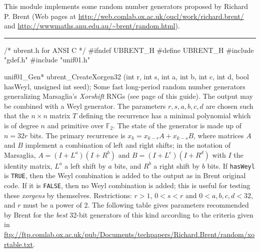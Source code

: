
This module implements some random number generators proposed by Richard
  P. Brent (Web pages at %
\url{http://web.comlab.ox.ac.uk/oucl/work/richard.brent/}
and \url{http://wwwmaths.anu.edu.au/~brent/random.html}).


\bigskip
\hrule
\code\hide
/* ubrent.h for ANSI C */
#ifndef UBRENT_H
#define UBRENT_H
\endhide
#include "gdef.h"
#include "unif01.h"
\endcode

\code

unif01_Gen* ubrent_CreateXorgen32 (int r, int s, int a, int b, int c, int d,
                                   bool hasWeyl, unsigned int seed);
\endcode
  \tab Some fast long-period random number generators \cite{rBRE04a} 
        generalizing Marsaglia's \textit{Xorshift} RNGs \cite{rMAR03a} 
 (see page \pageref{marsa-xorshift} of this guide).  The
   output may be combined with a Weyl generator.
 The parameters $r, s, a, b,  c, d$ are chosen such that the $n \times n$
   matrix $T$ defining the recurrence has a minimal polynomial which
%
      is of degree $n$ and primitive over $\mathbb{F}_2$. 
The state of the generator is made up of $n= 32 r$ bits.
The primary recurrence is $x_k = x_{k-r}A + x_{k-s}B$, where matrices
$A$ and $B$ implement a combination of left and right shifts;
 in the notation of Marsaglia, $A = (I + L^a)(I + R^b)$ and
 $B = (I + L^c)(I + R^d)$ with
 $I$ the identity matrix, $L^a$ a left shift by $a$ bits, 
and $R^b$ a right shift by $b$ bits. If \texttt{hasWeyl} is \texttt{TRUE},
then the Weyl combination is added to the output as in Brent original
code. If it is  \texttt{FALSE}, then no Weyl combination is added;
 this is useful for testing these \textit{xorgens} by themselves.
Restrictions: $r > 1$, $0 < s < r$ and $0 < a,b,c,d < 32$,
and $r$ must be a power of 2.
%
The following table gives parameters recommended by Brent
for the \textit{best} 32-bit generators of this kind
according to the criteria given in \url{ftp://ftp.comlab.ox.ac.uk/pub/Documents/techpapers/Richard.Brent/random/xortable.txt}.
\endtab
%
